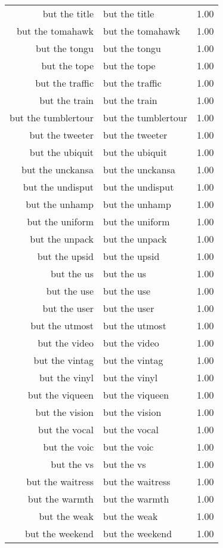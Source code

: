 \begin{table}[ht]
\begin{tabular}{rlr}
  but the title & but the title & 1.00 \\ 
  but the tomahawk & but the tomahawk & 1.00 \\ 
  but the tongu & but the tongu & 1.00 \\ 
  but the tope & but the tope & 1.00 \\ 
  but the traffic & but the traffic & 1.00 \\ 
  but the train & but the train & 1.00 \\ 
  but the tumblertour & but the tumblertour & 1.00 \\ 
  but the tweeter & but the tweeter & 1.00 \\ 
  but the ubiquit & but the ubiquit & 1.00 \\ 
  but the unckansa & but the unckansa & 1.00 \\ 
  but the undisput & but the undisput & 1.00 \\ 
  but the unhamp & but the unhamp & 1.00 \\ 
  but the uniform & but the uniform & 1.00 \\ 
  but the unpack & but the unpack & 1.00 \\ 
  but the upsid & but the upsid & 1.00 \\ 
  but the us & but the us & 1.00 \\ 
  but the use & but the use & 1.00 \\ 
  but the user & but the user & 1.00 \\ 
  but the utmost & but the utmost & 1.00 \\ 
  but the video & but the video & 1.00 \\ 
  but the vintag & but the vintag & 1.00 \\ 
  but the vinyl & but the vinyl & 1.00 \\ 
  but the viqueen & but the viqueen & 1.00 \\ 
  but the vision & but the vision & 1.00 \\ 
  but the vocal & but the vocal & 1.00 \\ 
  but the voic & but the voic & 1.00 \\ 
  but the vs & but the vs & 1.00 \\ 
  but the waitress & but the waitress & 1.00 \\ 
  but the warmth & but the warmth & 1.00 \\ 
  but the weak & but the weak & 1.00 \\ 
  but the weekend & but the weekend & 1.00 \\ 

\end{tabular}
\end{table}
